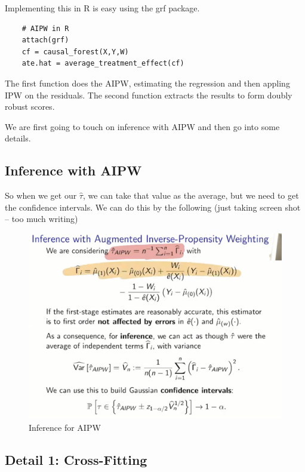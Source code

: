\documentclass{article}
\begin{document}
Implementing this in R is easy using the grf package. 

  \begin{verbatim}
    # AIPW in R
    attach(grf)
    cf = causal_forest(X,Y,W)
    ate.hat = average_treatment_effect(cf)
    \end{verbatim}

The first function does the AIPW, estimating the regression and then appling IPW on the residuals. The second function extracts the results to form doubly robust scores.

We are first going to touch on inference with AIPW and then go into some details.

\subsection{Inference with AIPW}

So when we get our $\hat{\tau}$, we can take that value as the average, but we need to get the confidence intervals. We can do this by the following (just taking screen shot -- too much writing)

\begin{figure}[H]
    \centering
    \includegraphics[scale = 0.3]{inference_aipw.png}
    \caption{Inference for AIPW}
    \label{fig:inference_aipw}
\end{figure}

\subsection{Detail 1: Cross-Fitting}
\end{document}
